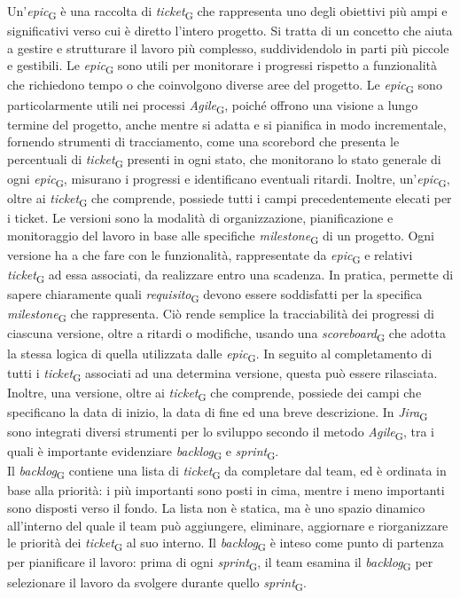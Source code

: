 Un'\textit{epic}\textsubscript{G} è una raccolta di \textit{ticket}\textsubscript{G} che rappresenta uno degli obiettivi più ampi e significativi verso cui è diretto l'intero progetto. Si tratta di un concetto che aiuta a gestire e strutturare il lavoro più complesso, suddividendolo in parti più piccole e gestibili. Le \textit{epic}\textsubscript{G} sono utili per monitorare i progressi rispetto a funzionalità che richiedono tempo o che coinvolgono diverse aree del progetto. Le \textit{epic}\textsubscript{G} sono particolarmente utili nei processi \textit{Agile}\textsubscript{G}, poiché offrono una visione a lungo termine del progetto, anche mentre si adatta e si pianifica in modo incrementale, fornendo strumenti di tracciamento, come una scorebord che presenta le percentuali di \textit{ticket}\textsubscript{G} presenti in ogni stato, che monitorano lo stato generale di ogni \textit{epic}\textsubscript{G}, misurano i progressi e identificano eventuali ritardi. Inoltre, un'\textit{epic}\textsubscript{G}, oltre ai \textit{ticket}\textsubscript{G} che comprende, possiede tutti i campi precedentemente elecati per i ticket.
Le versioni sono la modalità di organizzazione, pianificazione e monitoraggio del lavoro in base alle specifiche \textit{milestone}\textsubscript{G} di un progetto. Ogni versione ha a che fare con le funzionalità, rappresentate da \textit{epic}\textsubscript{G} e relativi \textit{ticket}\textsubscript{G} ad essa associati, da realizzare entro una scadenza. In pratica, permette di sapere chiaramente quali \textit{requisito}\textsubscript{G} devono essere soddisfatti per la specifica \textit{milestone}\textsubscript{G} che rappresenta. Ciò rende semplice la tracciabilità dei progressi di ciascuna versione, oltre a ritardi o modifiche, usando una \textit{scoreboard}\textsubscript{G} che adotta la stessa logica di quella utilizzata dalle \textit{epic}\textsubscript{G}. In seguito al completamento di tutti i \textit{ticket}\textsubscript{G} associati ad una determina versione, questa può essere rilasciata. Inoltre, una versione, oltre ai \textit{ticket}\textsubscript{G} che comprende, possiede dei campi che specificano la data di inizio, la data di fine ed una breve descrizione.
In \textit{Jira}\textsubscript{G} sono integrati diversi strumenti per lo sviluppo secondo il metodo \textit{Agile}\textsubscript{G}, tra i quali è importante evidenziare \textit{backlog}\textsubscript{G} e \textit{sprint}\textsubscript{G}.\\
Il \textit{backlog}\textsubscript{G} contiene una lista di \textit{ticket}\textsubscript{G} da completare dal team, ed è ordinata in base alla priorità: i più importanti sono posti in cima, mentre i meno importanti sono disposti verso il fondo. La lista non è statica, ma è uno spazio dinamico all'interno del quale il team può aggiungere, eliminare, aggiornare e riorganizzare le priorità dei \textit{ticket}\textsubscript{G} al suo interno. Il \textit{backlog}\textsubscript{G} è inteso come punto di partenza per pianificare il lavoro: prima di ogni \textit{sprint}\textsubscript{G}, il team esamina il \textit{backlog}\textsubscript{G} per selezionare il lavoro da svolgere durante quello \textit{sprint}\textsubscript{G}.\\
